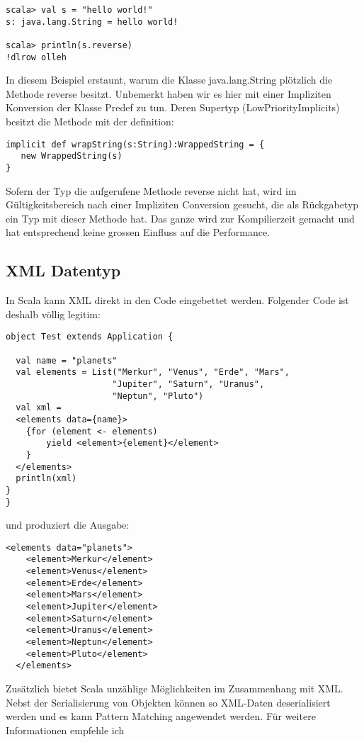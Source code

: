 \begin{lstlisting}[caption=Implicit Conversions am Beispiel String]
scala> val s = "hello world!"
s: java.lang.String = hello world!

scala> println(s.reverse)
!dlrow olleh
\end{lstlisting}
In diesem Beispiel erstaunt, warum die Klasse java.lang.String pl\"otzlich die Methode reverse besitzt. Unbemerkt haben wir es hier mit einer Impliziten Konversion der Klasse Predef zu tun. Deren Supertyp (LowPriorityImplicits) besitzt die Methode mit der definition:
\begin{lstlisting}[caption=Implicit Conversions Method wrapString]
implicit def wrapString(s:String):WrappedString = {
   new WrappedString(s)
}
\end{lstlisting}
Sofern der Typ die aufgerufene Methode reverse nicht hat, wird im G\"ultigkeitsbereich nach einer Impliziten Conversion gesucht, die als R\"uckgabetyp ein Typ mit dieser Methode hat. Das ganze wird zur Kompilierzeit gemacht und hat entsprechend keine grossen Einfluss auf die Performance.

\subsection{XML Datentyp}\label{grundlagen:scala:xmldatentyp}
In Scala kann XML direkt in den Code eingebettet werden. Folgender Code ist deshalb v\"ollig legitim:

\begin{lstlisting}[caption=XML Generierung mit Scala]
object Test extends Application {

  val name = "planets"
  val elements = List("Merkur", "Venus", "Erde", "Mars",
                     "Jupiter", "Saturn", "Uranus",
                     "Neptun", "Pluto")
  val xml =
  <elements data={name}>
    {for (element <- elements)
    	yield <element>{element}</element>
    }
  </elements>
  println(xml)
}
}\end{lstlisting}
und produziert die Ausgabe:
\begin{lstlisting}[caption=Ausgabe XML Generierung mit Scala]
<elements data="planets">
    <element>Merkur</element>
    <element>Venus</element>
    <element>Erde</element>
    <element>Mars</element>
    <element>Jupiter</element>
    <element>Saturn</element>
    <element>Uranus</element>
    <element>Neptun</element>
    <element>Pluto</element>
  </elements>
\end{lstlisting}

Zus\"atzlich bietet Scala unz\"ahlige M\"oglichkeiten im Zusammenhang mit XML. Nebst der Serialisierung von Objekten k\"onnen so XML-Daten deserialisiert werden und es kann Pattern Matching angewendet werden. F\"ur weitere Informationen empfehle ich \cite[p. 513 - 526]{odersky2008programming}




